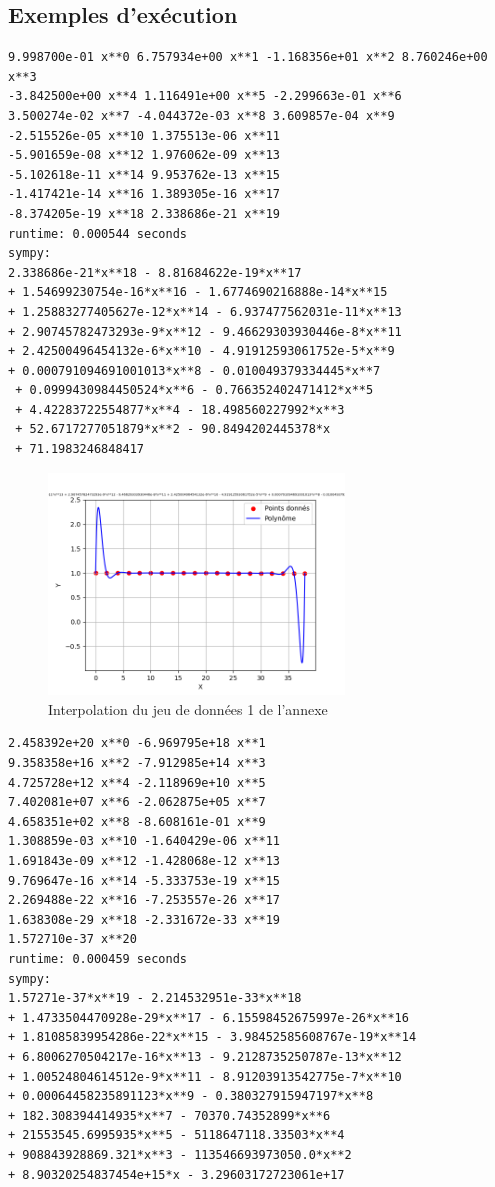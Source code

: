 \subsection{Exemples d'exécution}
\begin{lstlisting}[caption=res41.err, basicstyle=\fontsize{8}{10}\selectfont]
9.998700e-01 x**0 6.757934e+00 x**1 -1.168356e+01 x**2 8.760246e+00 x**3
-3.842500e+00 x**4 1.116491e+00 x**5 -2.299663e-01 x**6 
3.500274e-02 x**7 -4.044372e-03 x**8 3.609857e-04 x**9 
-2.515526e-05 x**10 1.375513e-06 x**11 
-5.901659e-08 x**12 1.976062e-09 x**13 
-5.102618e-11 x**14 9.953762e-13 x**15 
-1.417421e-14 x**16 1.389305e-16 x**17 
-8.374205e-19 x**18 2.338686e-21 x**19 
runtime: 0.000544 seconds
sympy: 
2.338686e-21*x**18 - 8.81684622e-19*x**17 
+ 1.54699230754e-16*x**16 - 1.6774690216888e-14*x**15 
+ 1.25883277405627e-12*x**14 - 6.937477562031e-11*x**13 
+ 2.90745782473293e-9*x**12 - 9.46629303930446e-8*x**11 
+ 2.42500496454132e-6*x**10 - 4.91912593061752e-5*x**9 
+ 0.000791094691001013*x**8 - 0.010049379334445*x**7
 + 0.0999430984450524*x**6 - 0.766352402471412*x**5 
 + 4.42283722554877*x**4 - 18.498560227992*x**3 
 + 52.6717277051879*x**2 - 90.8494202445378*x 
 + 71.1983246848417
\end{lstlisting}
\begin{figure}[h]
    \centering
    \includegraphics[width=0.7\textwidth]{sources/max/res41.-fig.png}
    \caption{Interpolation du jeu de données 1 de l'annexe}
\end{figure}
\newpage
\begin{lstlisting}[caption=res42.err, basicstyle=\fontsize{8}{10}\selectfont]
2.458392e+20 x**0 -6.969795e+18 x**1 
9.358358e+16 x**2 -7.912985e+14 x**3 
4.725728e+12 x**4 -2.118969e+10 x**5 
7.402081e+07 x**6 -2.062875e+05 x**7 
4.658351e+02 x**8 -8.608161e-01 x**9 
1.308859e-03 x**10 -1.640429e-06 x**11 
1.691843e-09 x**12 -1.428068e-12 x**13 
9.769647e-16 x**14 -5.333753e-19 x**15 
2.269488e-22 x**16 -7.253557e-26 x**17 
1.638308e-29 x**18 -2.331672e-33 x**19 
1.572710e-37 x**20 
runtime: 0.000459 seconds
sympy:
1.57271e-37*x**19 - 2.214532951e-33*x**18 
+ 1.4733504470928e-29*x**17 - 6.15598452675997e-26*x**16 
+ 1.81085839954286e-22*x**15 - 3.98452585608767e-19*x**14 
+ 6.8006270504217e-16*x**13 - 9.2128735250787e-13*x**12 
+ 1.00524804614512e-9*x**11 - 8.91203913542775e-7*x**10 
+ 0.00064458235891123*x**9 - 0.380327915947197*x**8 
+ 182.308394414935*x**7 - 70370.74352899*x**6 
+ 21553545.6995935*x**5 - 5118647118.33503*x**4 
+ 908843928869.321*x**3 - 113546693973050.0*x**2 
+ 8.90320254837454e+15*x - 3.29603172723061e+17
\end{lstlisting}
